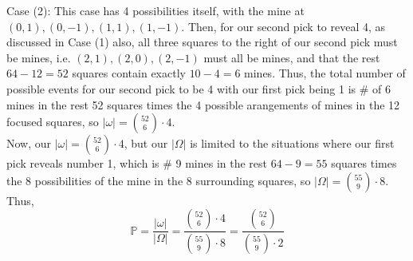 \documentclass{article}
\begin{document}
Case (2): This case has 4 possibilities itself, with the mine at $(0, 1), (0, -1), (1, 1), (1, -1)$. Then, for our second pick to reveal 4, as discussed in Case (1) also, all three squares to the right of our second pick must be mines, i.e. $(2,1), (2,0), (2,-1)$ must all be mines, and that the rest $64-12=52$ squares contain exactly $10-4=6$ mines. Thus, the total number of possible events for our second pick to be 4 with our first pick being 1 is \# of 6 mines in the rest 52 squares times the 4 possible arangements of mines in the 12 focused squares, so $|\omega| = \binom{52}{6}\cdot4$. \\

Now, our $|\omega| = \binom{52}{6}\cdot4$, but our $|\Omega|$ is limited to the situations where our first pick reveals number 1, which is \# 9 mines in the rest $64-9=55$ squares times the 8 possibilities of the mine in the 8 surrounding squares, so $|\Omega| = \binom{55}{9}\cdot8$. \\

Thus, $$\mathbb{P} = \frac{|\omega|}{|\Omega|} = \frac{\binom{52}{6}\cdot4}{\binom{55}{9}\cdot8} = \frac{\binom{52}{6}}{\binom{55}{9}\cdot2}$$
\end{document}

